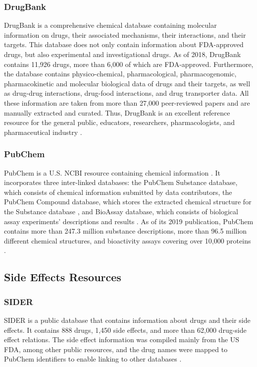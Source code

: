 \subsubsection{DrugBank}
DrugBank is a comprehensive chemical database containing  molecular information on drugs, their associated mechanisms, their interactions, and their targets. This database does not only contain information about \ac{FDA}-approved drugs, but also experimental and investigational drugs. As of 2018, DrugBank contains 11,926 drugs, more than 6,000 of which are \ac{FDA}-approved. Furthermore, the database contains physico-chemical, pharmacological, pharmacogenomic, pharmacokinetic and molecular biological data of drugs and their targets, as well as drug-drug interactions, drug-food interactions, and drug transporter data. All these information are taken from more than 27,000 peer-reviewed papers and are manually extracted and curated. Thus, DrugBank is an excellent reference resource for the general public, educators, researchers, pharmacologists, and pharmaceutical industry \cite{wishart_drugbank_2018}.

\subsubsection{PubChem}
PubChem is a U.S. \ac{NCBI} resource containing chemical information \cite{kim_pubchem_2019}. It incorporates three inter-linked databases: the PubChem Substance database, which consists of chemical information submitted by data contributors, the PubChem Compound database, which stores the extracted chemical structure for the Substance database \cite{kim_pubchem_2016}, and BioAssay database, which consists of biological assay experiments’ descriptions and results \cite{kim_pubchem_2019}. As of its 2019 publication, PubChem contains more than 247.3 million substance descriptions, more than 96.5 million different chemical structures, and bioactivity assays covering over 10,000 proteins \cite{kim_pubchem_2019}.

\subsection{Side Effects Resources}
\subsubsection{SIDER}
\ac{SIDER} is a public database that contains information about drugs and their side effects. It contains 888 drugs, 1,450 side effects, and more than 62,000 drug-side effect relations. The side effect information was compiled mainly from the US \ac{FDA}, among other public resources, and the drug names were mapped to PubChem identifiers to enable linking to other databases \cite{kuhn_side_2010}.

